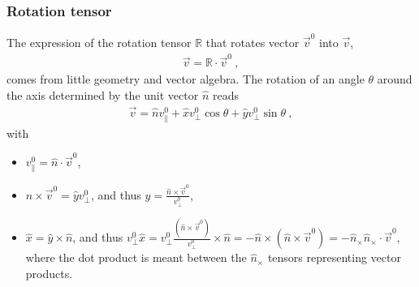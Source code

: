 \documentclass[letterpaper,10pt,english]{jupyterBook}
\begin{document}
\subsubsection{Rotation tensor}
\label{\detokenize{ch/kinematics-rotations-param-axis-angle:rotation-tensor}}\label{\detokenize{ch/kinematics-rotations-param-axis-angle:classical-mechanics-kinematics-rotations-axis-angle-rotation-tensor}}
\sphinxAtStartPar
The expression of the rotation tensor \(\mathbb{R}\) that rotates vector \(\vec{v}^0\) into \(\vec{v}\),
\begin{equation*}
\begin{split}\vec{v} = \mathbb{R} \cdot \vec{v}^0 \ ,\end{split}
\end{equation*}
\sphinxAtStartPar
comes from little geometry and vector algebra. The rotation of an angle \(\theta\) around the axis determined by the  unit vector \(\hat{n}\) reads
\begin{equation}\label{equation:ch/kinematics-rotations-param-axis-angle:eq:rotation:angle-axis:0}
\begin{split}\vec{v} = \hat{n} v^0_{\parallel} + \hat{x} v^0_{\perp} \cos \theta + \hat{y} v^0_{\perp} \sin \theta \ ,\end{split}
\end{equation}
\sphinxAtStartPar
with
\begin{itemize}
\item {} 
\sphinxAtStartPar
\(v^0_{\parallel} = \hat{n} \cdot \vec{v}^0\),

\item {} 
\sphinxAtStartPar
\(\hat{n} \times \vec{v}^0 = \hat{y} v^0_{\perp}\), and thus \(\hat{y} = \frac{\hat{n} \times \vec{v}^0}{v^0_{\perp}}\),

\item {} 
\sphinxAtStartPar
\(\hat{x} = \hat{y} \times \hat{n}\), and thus \(v^0_{\perp} \hat{x} = v^0_{\perp} \frac{(\hat{n} \times \vec{v}^0)}{v^0_{\perp}} \times \hat{n} = - \hat{n} \times \left( \hat{n} \times \vec{v}^0 \right) = - \hat{n}_{\times} \hat{n}_{\times} \cdot \vec{v}^0\), where the dot product is meant between the \(\hat{n}_\times\) tensors representing vector products.

\end{itemize}
\end{document}
